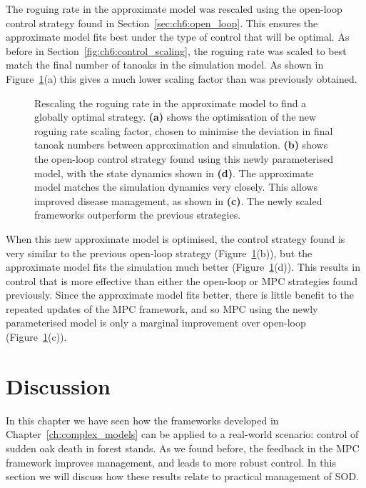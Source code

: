 The roguing rate in the approximate model was rescaled using the open-loop control strategy found in Section~\ref{sec:ch6:open_loop}. This ensures the approximate model fits best under the type of control that will be optimal. As before in Section~\ref{fig:ch6:control_scaling}, the roguing rate was scaled to best match the final number of tanoaks in the simulation model. As shown in Figure~\ref{fig:ch6:Global_optimal}(a) this gives a much lower scaling factor than was previously obtained.

\begin{figure}[t!]
    \begin{center}
        \caption[Globally optimal strategy]{Rescaling the roguing rate in the approximate model to find a globally optimal strategy. \textbf{(a)} shows the optimisation of the new roguing rate scaling factor, chosen to minimise the deviation in final tanoak numbers between approximation and simulation. \textbf{(b)} shows the open-loop control strategy found using this newly parameterised model, with the state dynamics shown in \textbf{(d)}. The approximate model matches the simulation dynamics very closely. This allows improved disease management, as shown in \textbf{(c)}. The newly scaled frameworks outperform the previous strategies.\label{fig:ch6:Global_optimal}}
    \end{center}
\end{figure}

When this new approximate model is optimised, the control strategy found is very similar to the previous open-loop strategy (Figure~\ref{fig:ch6:Global_optimal}(b)), but the approximate model fits the simulation much better (Figure~\ref{fig:ch6:Global_optimal}(d)). This results in control that is more effective than either the open-loop or MPC strategies found previously. Since the approximate model fits better, there is little benefit to the repeated updates of the MPC framework, and so MPC using the newly parameterised model is only a marginal improvement over open-loop (Figure~\ref{fig:ch6:Global_optimal}(c)).

\FloatBarrier
\section{Discussion\label{sec:ch6:discussion}}

In this chapter we have seen how the frameworks developed in Chapter~\ref{ch:complex_models} can be applied to a real-world scenario: control of sudden oak death in forest stands. As we found before, the feedback in the MPC framework improves management, and leads to more robust control. In this section we will discuss how these results relate to practical management of SOD.

